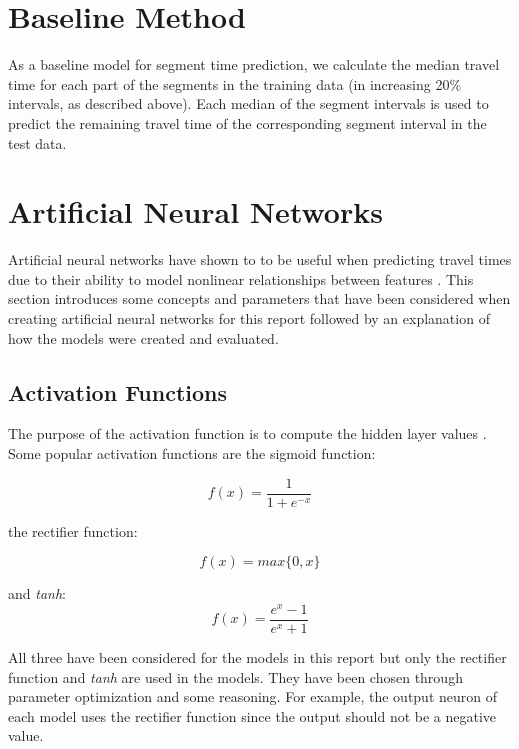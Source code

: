 \section{Baseline Method}
As a baseline model for segment time prediction, we calculate the median travel time for each part of the segments in the training data (in increasing 20\% intervals, as described above). Each median of the segment intervals is used to predict the remaining travel time of the corresponding segment interval in the test data.

\section{Artificial Neural Networks}

Artificial neural networks have shown to to be useful when predicting travel times due to their ability to model nonlinear relationships between features \cite{brazilANN}\cite{malaysiaANN}. This section introduces some concepts and parameters that have been considered when creating artificial neural networks for this report followed by an explanation of how the models were created and evaluated.

\subsection{Activation Functions}
The purpose of the activation function is to compute the hidden layer values \cite{Goodfellow-et-al-2016}. Some popular activation functions are the sigmoid function:

\begin{equation} 
	f(x) = \frac{1}{1+e^{-x}} 
\end{equation}

the rectifier function:

\begin{equation} 
	f(x) = max\{0,x\}
\end{equation}

and \textit{tanh}:
\begin{equation} 
	f(x) =  \frac{e^x-1}{e^{x}+1} 
\end{equation}

All three have been considered for the models in this report but only the rectifier function and \textit{tanh} are used in the models. They have been chosen through parameter optimization and some reasoning. For example, the output neuron of each model uses the rectifier function since the output should not be a negative value.

